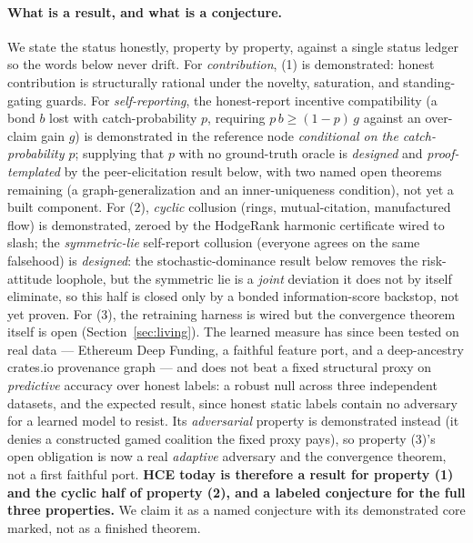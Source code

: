 \documentclass[10pt]{article}
\begin{document}
\paragraph{What is a result, and what is a conjecture.} We state the status honestly, property by
property, against a single status ledger so the words below never drift. For \emph{contribution}, (1)
is demonstrated: honest contribution is structurally rational under the novelty, saturation, and
standing-gating guards. For \emph{self-reporting}, the honest-report incentive compatibility (a bond
$b$ lost with catch-probability $p$, requiring $p\,b \ge (1-p)\,g$ against an over-claim gain $g$) is
demonstrated in the reference node \emph{conditional on the catch-probability $p$}; supplying that $p$
with no ground-truth oracle is \emph{designed} and \emph{proof-templated} by the peer-elicitation
result below, with two named open theorems remaining (a graph-generalization and an inner-uniqueness
condition), not yet a built component. For (2), \emph{cyclic} collusion (rings, mutual-citation,
manufactured flow) is demonstrated, zeroed by the HodgeRank harmonic certificate wired to slash; the
\emph{symmetric-lie} self-report collusion (everyone agrees on the same falsehood) is \emph{designed}:
the stochastic-dominance result below removes the risk-attitude loophole, but the symmetric lie is a
\emph{joint} deviation it does not by itself eliminate, so this half is closed only by a bonded
information-score backstop, not yet proven. For (3), the retraining harness is wired but the
convergence theorem itself is open (Section~\ref{sec:living}). The learned measure has since been tested
on real data --- Ethereum Deep Funding, a faithful feature port, and a deep-ancestry crates.io
provenance graph --- and does not beat a fixed structural proxy on \emph{predictive} accuracy over
honest labels: a robust null across three independent datasets, and the expected result, since honest
static labels contain no adversary for a learned model to resist. Its \emph{adversarial} property is
demonstrated instead (it denies a constructed gamed coalition the fixed proxy pays), so property (3)'s
open obligation is now a real \emph{adaptive} adversary and the convergence theorem, not a first
faithful port. \textbf{HCE today is therefore a result for property (1) and the cyclic half of
property (2), and a labeled conjecture for the full three properties.} We claim it as a named
conjecture with its demonstrated core marked, not as a finished theorem.
\end{document}
